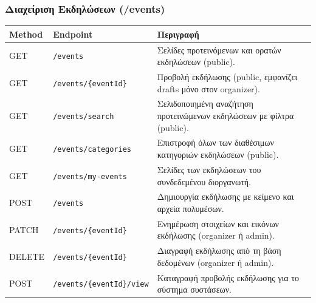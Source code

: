 \documentclass[12pt]{fphw}
\newcommand{\en}[1]{\foreignlanguage{english}{#1}}
\begin{document}
\subsubsection{Διαχείριση Εκδηλώσεων (/events)}
\begin{table}[H]
    \centering
    \small
    \begin{tabularx}{\textwidth}{llX}
    \toprule
    \textbf{Method} & \textbf{Endpoint} & \textbf{Περιγραφή} \\
    \midrule
    \en{GET} & \en{\texttt{/events}} & Σελίδες προτεινόμενων και ορατών εκδηλώσεων (\en{public}). \\
    \addlinespace[1pt]
    \en{GET} & \en{\texttt{/events/\{eventId\}}} & Προβολή εκδήλωσης (\en{public}, εμφανίζει \en{drafts} μόνο στον \en{organizer}). \\
    \addlinespace[1pt]
    \en{GET} & \en{\texttt{/events/search}} & Σελιδοποιημένη αναζήτηση προτεινώμενων εκδηλώσεων με φίλτρα (\en{public}). \\
    \addlinespace[1pt]
    \en{GET} & \en{\texttt{/events/categories}} & Επιστροφή όλων των διαθέσιμων κατηγοριών εκδηλώσεων (\en{public}). \\
    \addlinespace[1pt]
    \en{GET} & \en{\texttt{/events/my-events}} & Σελίδες των εκδηλώσεων του συνδεδεμένου διοργανωτή. \\
    \addlinespace[1pt]
    \en{POST} & \en{\texttt{/events}} & Δημιουργία εκδήλωσης με κείμενο και αρχεία πολυμέσων. \\
    \addlinespace[1pt]
    \en{PATCH} & \en{\texttt{/events/\{eventId\}}} & Ενημέρωση στοιχείων και εικόνων εκδήλωσης (\en{organizer} ή \en{admin}). \\
    \addlinespace[1pt]
    \en{DELETE} & \en{\texttt{/events/\{eventId\}}} & Διαγραφή εκδήλωσης από τη βάση δεδομένων (\en{organizer} ή \en{admin}). \\
    \addlinespace[1pt]
    \en{POST} & \en{\texttt{/events/\{eventId\}/view}} & Καταγραφή προβολής εκδήλωσης για το σύστημα συστάσεων. \\
    \bottomrule
    \end{tabularx}
\end{table}
\end{document}
